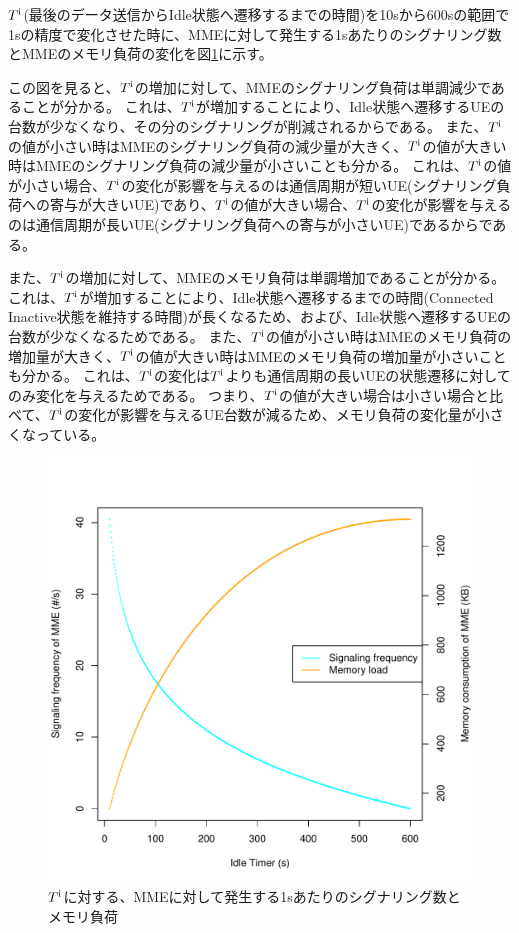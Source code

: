 \documentclass[a4j]{ujarticle}
\begin{document}
$T^{\rm i}$(最後のデータ送信からIdle状態へ遷移するまでの時間)を10sから600sの範囲で1sの精度で変化させた時に、MMEに対して発生する1sあたりのシグナリング数とMMEのメモリ負荷の変化を図\ref{signaling_and_memoryload_vs_idleTimer}に示す。

この図を見ると、$T^{\rm i}$の増加に対して、MMEのシグナリング負荷は単調減少であることが分かる。
これは、$T^{\rm i}$が増加することにより、Idle状態へ遷移するUEの台数が少なくなり、その分のシグナリングが削減されるからである。
また、$T^{\rm i}$の値が小さい時はMMEのシグナリング負荷の減少量が大きく、$T^{\rm i}$の値が大きい時はMMEのシグナリング負荷の減少量が小さいことも分かる。
これは、$T^{\rm i}$の値が小さい場合、$T^{\rm i}$の変化が影響を与えるのは通信周期が短いUE(シグナリング負荷への寄与が大きいUE)であり、$T^{\rm i}$の値が大きい場合、$T^{\rm i}$の変化が影響を与えるのは通信周期が長いUE(シグナリング負荷への寄与が小さいUE)であるからである。

また、$T^{\rm i}$の増加に対して、MMEのメモリ負荷は単調増加であることが分かる。
これは、$T^{\rm i}$が増加することにより、Idle状態へ遷移するまでの時間(Connected Inactive状態を維持する時間)が長くなるため、および、Idle状態へ遷移するUEの台数が少なくなるためである。
また、$T^{\rm i}$の値が小さい時はMMEのメモリ負荷の増加量が大きく、$T^{\rm i}$の値が大きい時はMMEのメモリ負荷の増加量が小さいことも分かる。
これは、$T^{\rm i}$の変化は$T^{\rm i}$よりも通信周期の長いUEの状態遷移に対してのみ変化を与えるためである。
つまり、$T^{\rm i}$の値が大きい場合は小さい場合と比べて、$T^{\rm i}$の変化が影響を与えるUE台数が減るため、メモリ負荷の変化量が小さくなっている。
\begin{figure}[htbp]
  \centering
  \includegraphics[width=0.9\hsize]{signaling_and_memoryload_vs_idleTimer.pdf}
  \caption{$T^{\rm i}$に対する、MMEに対して発生する1sあたりのシグナリング数とメモリ負荷}
  \label{signaling_and_memoryload_vs_idleTimer}
\end{figure}
\end{document}
